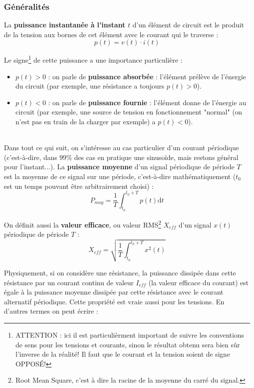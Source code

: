 \subsubsection*{Généralités}
La \textbf{puissance instantanée à l'instant $t$} d'un élément de circuit est le produit de la tension aux bornes de cet élément avec le courant qui le traverse :
\begin{equation}
p(t) = v(t)\cdot i(t)
\end{equation}

Le signe\footnote{ATTENTION : ici il est particulièrment important de suivre les conventions de sens pour les tensions et courants, sinon le résultat obtenu sera bien sûr l'inverse de la réalité! Il faut que le courant et la tension soient de signe OPPOSÉ!} de cette puissance a une importance particulière :
\begin{itemize}
\item $p(t) > 0$ : on parle de \textbf{puissance absorbée} : l'élément prélève de l'énergie du circuit (par exemple, une résistance a toujours $p(t) > 0$).
\item $p(t) < 0$ : on parle de \textbf{puissance fournie} : l'élément donne de l'énergie au circuit (par exemple, une source de tension en fonctionnement "normal" (on n'est pas en train de la charger par exemple) a $p(t) < 0$).
\end{itemize}
\hspace{0pt} \\
Dans tout ce qui suit, on s'intéresse au cas particulier d'un courant périodique (c'est-à-dire, dans $99\%$ des cas en pratique une sinusoïde, mais restons général pour l'instant...).
La \textbf{puissance moyenne} d'un signal périodique de période $T$ est la moyenne de ce signal sur une période, c'est-à-dire mathématiquement ($t_0$ est un temps pouvant être arbitrairement choisi) :
\begin{equation}
P_{moy} = \frac{1}{T} \int_{t_0}^{t_0 + T} p(t) \mathrm{d}t
\end{equation}

On définit aussi la \textbf{valeur efficace}, ou valeur RMS\footnote{Root Mean Square, c'est à dire la racine de la moyenne du carré du signal.} $X_{eff}$ d'un signal $x(t)$ périodique de période $T$ :
\begin{equation}
X_{eff} = \sqrt{\frac{1}{T} \int_{t_0}^{t_0 + T} x^2(t)}
\end{equation}

Physiquement, si on considère une résistance, la puissance dissipée dans cette résistance par un courant continu de valeur $I_{eff}$ (la valeur efficace du courant) est égale à la puissance moyenne dissipée par cette résistance avec le courant alternatif périodique. Cette propriété est vraie aussi pour les tensions. En d'autres termes on peut écrire :

